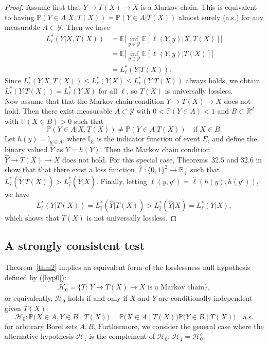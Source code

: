 \documentclass[11pt]{article}
\def\R{{\mathbb R}}
\def\Y{\mathcal{Y}}
\def\PROB {{\mathbb P}}
\def\EXP {{\mathbb E}}
\def\IND{{\mathbb I}}
\begin{document}
\begin{proof} Assume first that  $Y\to T(X) \to X$ is a Markov chain.  This is
  equivalent to having   $\PROB(Y\in A| X,T(X)) = \PROB(Y\in A|T(X)) $ almost surely (a.s.) for any measurable $A\subset \Y$. Then we have
\begin{align*}
L_\ell^*(Y|X,T(X))
&=  \EXP\big[\inf_{y\in \Y} \EXP [\ell(Y,y)|X,T(X)] \big]  \\
&= \EXP\big[\inf_{y\in \Y} \EXP [\ell(Y,y)|T(X)] \big]  \\
&=  L_\ell^*(Y|T(X)).
\end{align*}
Since $L_\ell^*(Y|X,T(X))\le  L_\ell ^*(Y|X)\le L_\ell^*(Y|T(X))$ always holds,
we obtain  $L_\ell^*(Y|T(X))= L_\ell ^*(Y|X)$ for all $\ell$, so  $T(X)$ is universally
lossless.\\
Now assume that that the Markov chain condition $Y\to T(X)\to X$ does not
hold. Then there exist measurable $A\subset \Y$ with $0<\PROB(Y\in A)<1$ and
$B\subset \R^d$ with $\PROB(X\in B)>0$  such that
\[
  \PROB(Y\in A|X,T(X)) \neq \PROB(Y\in A| T(X)) \quad \text{if $X\in B$}.
\]
Let $h(y)=\IND_{y\in A}$, where $\IND_E$ is the indicator function of event $E$, and define the binary valued $\hat{Y}$ as
$\hat{Y}=h(Y)$. Then the Markov chain condition $\hat{Y}\to T(X)\to X$ does not
hold.  For this special case, Theorems~32.5 and 32.6 in
\cite{DeGyLu96} show that that there exist a loss function
$\hat{\ell}: \{0,1\}^2\to \R_+$ such that
$L_{\hat{\ell}}^*(\hat{Y}|T(X))> L_{\hat{\ell}} ^*(\hat{Y}|X)$. Finally, letting
$\ell(y,y') = \hat{\ell}(h(y),h(y'))$, we have
\[
  L_{\ell}^*(Y|T(X))=  L_{\hat{\ell}}^*(\hat{Y}|T(X))> L_{\hat{\ell}}^*(\hat{Y}|X)=  L_{\ell}^*(Y|X),
\]
which shows that $T(X)$ is not universally lossless.
\end{proof}

\subsection{A strongly consistent test}

Theorem~\ref{thm2} implies an equivalent form of the losslessness null hypothesis defined by (\ref{hyp0}):
\begin{align}
\label{hyp1}
\mathcal{H}_0=\{T:\, Y\to T(X) \to X \mbox{ is a Markov chain}\}, 
\end{align}
or equivalently, $\mathcal{H}_0$ holds if and only if $X$ and $Y$ are conditionally independent given $T(X)$:
\[
\mathcal{H}_0: \PROB\big(X\in A, Y\in B \mid T(X)\big)  =\PROB\big(X\in A \mid T(X)\big) \PROB\big(Y\in B \mid T(X)\big)  \quad \text{a.s.}
\]
for arbitrary Borel sets $A,B$. 
Furthermore, we consider the general case where the alternative hypothesis $\mathcal{H}_1$ is the complement of $\mathcal{H}_0$:  $\mathcal H_1=\mathcal H_0^c$.
\end{document}
